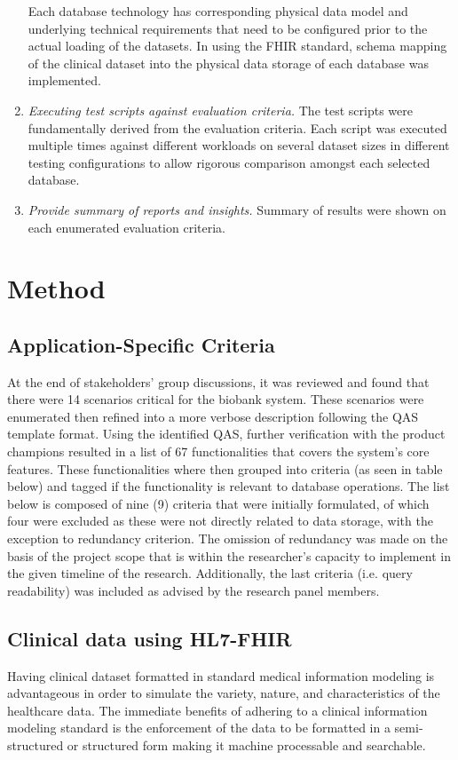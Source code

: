 \documentclass[5p]{elsarticle}
\begin{document}
\begin{enumerate}
Each database technology has corresponding physical data model and underlying technical requirements that need to be configured prior to the actual loading of the datasets. In using the FHIR standard, schema mapping of the clinical dataset into the physical data storage of each database was implemented.
\item \emph{Executing test scripts against evaluation criteria.} The test scripts were fundamentally derived from the evaluation criteria. Each script was executed multiple times against different workloads on several dataset sizes in different testing configurations to allow rigorous comparison amongst each selected database.
\item \emph{Provide summary of reports and insights.} Summary of results were shown on each enumerated evaluation criteria.
\end{enumerate}

\section{Method}

\subsection{Application-Specific Criteria}
At the end of stakeholders’ group discussions, it was reviewed and found that there were 14 scenarios critical for the biobank system. These scenarios were enumerated then refined into a more verbose description following the QAS template format. Using the identified QAS, further verification with the product champions resulted in a list of 67 functionalities that covers the system’s core features. These functionalities where then grouped into criteria (as seen in table below) and tagged if the functionality is relevant to database operations. The list below is composed of nine (9) criteria that were initially formulated, of which four were excluded as these were not directly related to data storage, with the exception to redundancy criterion. The omission of redundancy was made on the basis of the project scope that is within the researcher’s capacity to implement in the given timeline of the research. Additionally, the last criteria (i.e. query readability) was included as advised by the research panel members.

\subsection{Clinical data using HL7-FHIR}
Having clinical dataset formatted in standard medical information modeling is advantageous in order to simulate the variety, nature, and characteristics of the healthcare data. 
The immediate benefits of adhering to a clinical information modeling standard is the enforcement of the data 
to be formatted in a semi-structured or structured form making it machine processable \cite{G.Weglarz200419} and searchable.
\end{document}
